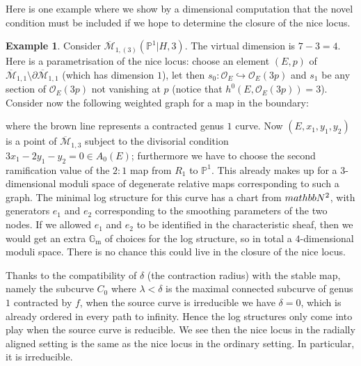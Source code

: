 \documentclass[11pt]{amsart}
\newcommand{\oM}{\overline{\mathcal{M}}}
\newcommand{\M}[4]{\overline{\mathcal{M}}_{#1,#2}(#3,#4)}
\newcommand{\PP}{\mathbb P}
\newcommand{\OO}{\mathcal{O}}
\newcommand{\Gm}{\mathbb{G}_{\text{m}}}
\theoremstyle{definition}
\theoremstyle{definition}
\newtheorem{example}[thm]{Example}
\begin{document}
Here is one example where we show by a dimensional computation that the novel condition must be included if we hope to determine the closure of the nice locus.
\begin{example}
Consider $\M{1}{(3)}{\PP^1|H}{3}$. The virtual dimension is $7-3=4$. Here is a parametrisation of the nice locus: choose an element $(E,p)$ of $\oM_{1,1}\setminus\partial\oM_{1,1}$ (which has dimension $1$), let then $s_0\colon\OO_E\hookrightarrow\OO_E(3p)$ and $s_1$ be any section of $\OO_E(3p)$ not vanishing at $p$ (notice that $h^0(E,\OO_E(3p))=3$). Consider now the following weighted graph for a map in the boundary:
\begin{center}
\end{center}
where the brown line represents a contracted genus $1$ curve. Now $(E,x_1,y_1,y_2)$ is a point of $\oM_{1,3}$ subject to the divisorial condition $3x_1-2y_1-y_2=0\in A_0(E)$; furthermore we have to choose the second ramification value of the $2\colon 1$ map from $R_1$ to $\PP^1$. This already makes up for a $3$-dimensional moduli space of degenerate relative maps corresponding to such a graph. The minimal log structure for this curve has a chart from $\-mathbb N^2$, with generators $e_1$ and $e_2$ corresponding to the smoothing parameters of the two nodes. If we allowed $e_1$ and $e_2$ to be identified in the characteristic sheaf, then we would get an extra $\Gm$ of choices for the log structure, so in total a $4$-dimensional moduli space. There is no chance this could live in the closure of the nice locus.
\end{example}

Thanks to the compatibility of $\delta$ (the contraction radius) with the stable map, namely the subcurve $C_0$ where $\lambda<\delta$ is the maximal connected subcurve of genus $1$ contracted by $f$, when the source curve is irreducible we have $\delta=0$, which is already ordered in every path to infinity. Hence the log structures only come into play when the source curve is reducible. We see then the nice locus in the radially aligned setting is the same as the nice locus in the ordinary setting. In particular, it is irreducible.
\end{document}
